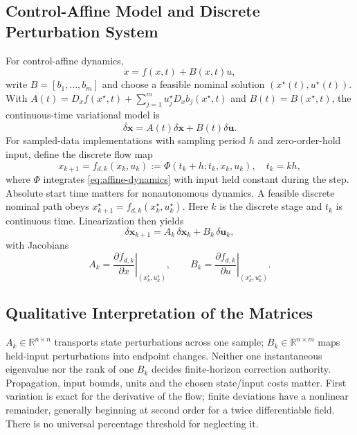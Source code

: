 \documentclass[11pt,letterpaper]{article}
\newcommand{\dx}{\delta\mathbf{x}}
\newcommand{\du}{\delta\mathbf{u}}
\begin{document}
\subsection{Control-Affine Model and Discrete Perturbation System}
For control-affine dynamics,
\begin{equation}
\dot x = f(x,t) + B(x,t)u,
\label{eq:affine-dynamics}
\end{equation}
write $B=[b_1,\ldots,b_m]$ and choose a feasible nominal solution $(x^\star(t),u^\star(t))$. With $A(t)=D_xf(x^\star,t)+\sum_{j=1}^m u_j^\star D_xb_j(x^\star,t)$ and $B(t)=B(x^\star,t)$, the continuous-time variational model is
\begin{equation}
\dot{\dx} = A(t)\dx + B(t)\du.
\label{eq:ct-variational-control-affine}
\end{equation}
For sampled-data implementations with sampling period $h$ and zero-order-hold input, define the discrete flow map
\begin{equation}
x_{k+1} = f_{d,k}(x_k,u_k) := \Phi(t_k+h;t_k,x_k,u_k),\quad t_k=kh,
\label{eq:discrete-flow-map}
\end{equation}
where $\Phi$ integrates \eqref{eq:affine-dynamics} with input held constant during the step. Absolute start time matters for nonautonomous dynamics. A feasible discrete nominal path obeys $x_{k+1}^\star=f_{d,k}(x_k^\star,u_k^\star)$. Here $k$ is the discrete stage and $t_k$ is continuous time. Linearization then yields
\begin{equation}
\dx_{k+1} = A_k\,\dx_k + B_k\,\du_k,
\label{eq:discrete-perturbation}
\end{equation}
with Jacobians
\begin{equation}
A_k = \left.\frac{\partial f_{d,k}}{\partial x}\right|_{(x_k^\star,u_k^\star)},
\qquad
B_k = \left.\frac{\partial f_{d,k}}{\partial u}\right|_{(x_k^\star,u_k^\star)}.
\label{eq:ab-jacobians}
\end{equation}

\subsection{Qualitative Interpretation of the Matrices}
$A_k\in\mathbb R^{n\times n}$ transports state perturbations across one sample; $B_k\in\mathbb R^{n\times m}$ maps held-input perturbations into endpoint changes. Neither one instantaneous eigenvalue nor the rank of one $B_k$ decides finite-horizon correction authority. Propagation, input bounds, units and the chosen state/input costs matter. First variation is exact for the derivative of the flow; finite deviations have a nonlinear remainder, generally beginning at second order for a twice differentiable field. There is no universal percentage threshold for neglecting it.
\end{document}
